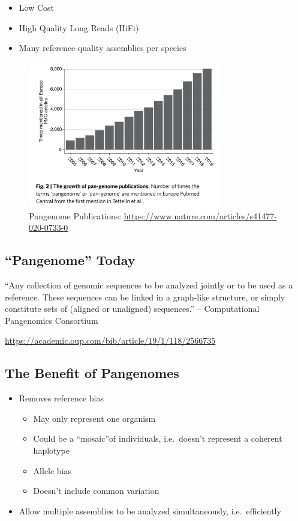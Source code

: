 \documentclass[
]{book}
\providecommand{\tightlist}{%
  \setlength{\itemsep}{0pt}\setlength{\parskip}{0pt}}
\begin{document}
\begin{itemize}
\tightlist
\item
  Low Cost
\item
  High Quality Long Reads (HiFi)
\item
  Many reference-quality assemblies per species
\end{itemize}

\begin{figure}
\centering
\includegraphics[width=0.75\textwidth,height=\textheight]{./Figures/GenomePubs.png}
\caption{Pangenome Publications: \url{https://www.nature.com/articles/s41477-020-0733-0}}
\end{figure}

\hypertarget{pangenome-today}{%
\subsection{``Pangenome'' Today}\label{pangenome-today}}

``Any collection of genomic sequences to be analyzed jointly or to be used as a reference. These sequences can be linked in a graph-like structure, or simply constitute sets of (aligned or unaligned) sequences.'' -- Computational Pangenomics Consortium

\url{https://academic.oup.com/bib/article/19/1/118/2566735}

\hypertarget{the-benefit-of-pangenomes}{%
\subsection{The Benefit of Pangenomes}\label{the-benefit-of-pangenomes}}

\begin{itemize}
\tightlist
\item
  Removes reference bias

  \begin{itemize}
  \tightlist
  \item
    May only represent one organism
  \item
    Could be a ``mosaic''of individuals, i.e.~doesn't represent a coherent haplotype
  \item
    Allele bias
  \item
    Doesn't include common variation
  \end{itemize}
\item
  Allow multiple assemblies to be analyzed simultaneously, i.e.~efficiently
\end{itemize}
\end{document}
